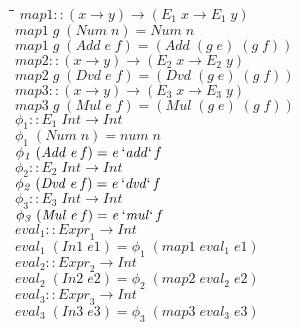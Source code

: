 \documentclass[10pt]{article}
\newlength{\lwidth}\setlength{\lwidth}{4.5cm}
\newlength{\cwidth}\setlength{\cwidth}{8mm} %
\newcommand{\Conid}[1]{\mathit{#1}}
\newcommand{\Varid}[1]{\mathit{#1}}
\begin{document}
\begin{tabbing}
\qquad\=\hspace{\lwidth}\=\hspace{\cwidth}\=\+\kill
${\Varid{map1}\mathbin{::}(\Varid{x}\to \Varid{y})\to (\Varid{E}_1\;\Varid{x}\to \Varid{E}_1\;\Varid{y})}$\\
${\Varid{map1}\;\Varid{g}\;(\Conid{Num}\;\Varid{n})\mathrel{=}\Conid{Num}\;\Varid{n}}$\\
${\Varid{map1}\;\Varid{g}\;(\Conid{Add}\;\Varid{e}\;\Varid{f})\mathrel{=}(\Conid{Add}\;(\Varid{g}\;\Varid{e})\;(\Varid{g}\;\Varid{f}))}$\\
${}$\\
${\Varid{map2}\mathbin{::}(\Varid{x}\to \Varid{y})\to (\Varid{E}_2\;\Varid{x}\to \Varid{E}_2\;\Varid{y})}$\\
${\Varid{map2}\;\Varid{g}\;(\Conid{Dvd}\;\Varid{e}\;\Varid{f})\mathrel{=}(\Conid{Dvd}\;(\Varid{g}\;\Varid{e})\;(\Varid{g}\;\Varid{f}))}$\\
${}$\\
${\Varid{map3}\mathbin{::}(\Varid{x}\to \Varid{y})\to (\Varid{E}_3\;\Varid{x}\to \Varid{E}_3\;\Varid{y})}$\\
${\Varid{map3}\;\Varid{g}\;(\Conid{Mul}\;\Varid{e}\;\Varid{f})\mathrel{=}(\Conid{Mul}\;(\Varid{g}\;\Varid{e})\;(\Varid{g}\;\Varid{f}))}$\\
${}$\\
${\Varid{\phi_1}\mathbin{::}\Varid{E}_1\;\Conid{Int}\to \Conid{Int}}$\\
${\Varid{\phi_1}\;(\Conid{Num}\;\Varid{n})\mathrel{=}\Varid{num}\;\Varid{n}}$\\
${\Varid{\phi_1}\;(\Conid{Add}\;\Varid{e}\;\Varid{f})\mathrel{=}\Varid{e}\mathbin{`\Varid{add}`}\Varid{f}}$\\
${}$\\
${\Varid{\phi_2}\mathbin{::}\Varid{E}_2\;\Conid{Int}\to \Conid{Int}}$\\
${\Varid{\phi_2}\;(\Conid{Dvd}\;\Varid{e}\;\Varid{f})\mathrel{=}\Varid{e}\mathbin{`\Varid{dvd}`}\Varid{f}}$\\
${}$\\
${\Varid{\phi_3}\mathbin{::}\Varid{E}_3\;\Conid{Int}\to \Conid{Int}}$\\
${\Varid{\phi_3}\;(\Conid{Mul}\;\Varid{e}\;\Varid{f})\mathrel{=}\Varid{e}\mathbin{`\Varid{mul}`}\Varid{f}}$\\
${}$\\
${\Varid{eval}_1\mathbin{::}\Varid{Expr}_1\to \Conid{Int}}$\\
${\Varid{eval}_1\;(\Conid{In1}\;\Varid{e1})\mathrel{=}\Varid{\phi_1}\;(\Varid{map1}\;\Varid{eval}_1\;\Varid{e1})}$\\
${}$\\
${\Varid{eval}_2\mathbin{::}\Varid{Expr}_2\to \Conid{Int}}$\\
${\Varid{eval}_2\;(\Conid{In2}\;\Varid{e2})\mathrel{=}\Varid{\phi_2}\;(\Varid{map2}\;\Varid{eval}_2\;\Varid{e2})}$\\
${}$\\
${\Varid{eval}_3\mathbin{::}\Varid{Expr}_3\to \Conid{Int}}$\\
${\Varid{eval}_3\;(\Conid{In3}\;\Varid{e3})\mathrel{=}\Varid{\phi_3}\;(\Varid{map3}\;\Varid{eval}_3\;\Varid{e3})}$
\end{tabbing}
\end{document}
